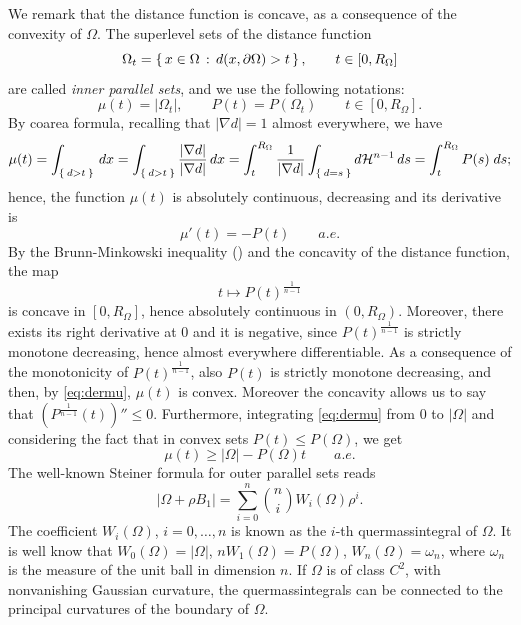 \documentclass[oneside,a4paper,11pt,notitlepage]{article}
\newcommand{\abs}[1]{{\left|#1\right|}}
\theoremstyle{definition}
\theoremstyle{plain}
\theoremstyle{definition}
\begin{document}
We remark that the distance function is concave, as a consequence of the convexity of $\Omega$.
The superlevel sets of the distance function
\begin{equation*}
    \Omega_t=\set{x\in \Omega \, : \, d(x,\partial\Omega)>t}, \qquad t\in[0, R_\Omega]
\end{equation*}
 are called \emph{inner parallel sets}, and we use the following notations:
 \begin{equation*}
 \mu(t)= \abs{\Omega_t}, \qquad P(t)=P(\Omega_t)\qquad t\in[0, R_\Omega].
 \end{equation*}
 By coarea formula, recalling that $\abs{\nabla d}=1$ almost everywhere, we have 
 $$\mu(t)=\int_{\Set{d>t}} \,  dx = \int_{\Set{d>t}} \frac{\abs{\nabla d}}{\abs{\nabla d}} \,  dx= \int_{t}^{R_\Omega} \frac{1}{\abs{\nabla d}} \int_{\Set{d=s}} d\mathcal{H}^{n-1} \, ds= \int_{t}^{R_\Omega} P(s)\; ds;$$
hence, the function $\mu(t)$ is absolutely continuous, decreasing and its derivative is  
\begin{equation}\label{eq:dermu}
    \mu'(t)=-P(t)\qquad a.e.
\end{equation}
By the Brunn-Minkowski inequality (\cite[Theorem 7.4.5]{schneider}) and the concavity of the distance function, the map
\begin{equation*}
    t \mapsto P(t)^{\frac{1}{n-1}}
\end{equation*}
is concave in $[0,R_{\Omega}]$, hence absolutely continuous in $(0,R_{\Omega})$. Moreover, there exists its right derivative at $0$ and it is negative, since $P(t)^{\frac{1}{n-1}}$ is strictly monotone decreasing, hence almost everywhere differentiable. As a consequence of the monotonicity of $P(t)^{\frac{1}{n-1}}$, also $P(t)$ is strictly monotone decreasing, and then, by \eqref{eq:dermu}, $\mu(t)$ is convex. Moreover the concavity allows us to say that $(P^\frac{1}{n-1}(t))''\le 0$. Furthermore, integrating \eqref{eq:dermu} from $0$ to $\abs{\Omega}$ and considering the fact that in convex sets $P(t)\le P(\Omega)$, we get
\begin{equation}
\label{steiner-measure}
    \mu(t) \ge \abs{\Omega}-P(\Omega)t \qquad a.e.
\end{equation}
The well-known Steiner formula for outer parallel sets reads
\[
|\Omega+\rho B_1| =\sum_{i=0}^{n} \binom{n}{i} W_i(\Omega) \rho^i.
\]
The coefficient $W_i(\Omega)$, $i=0,\ldots,n$ is known as the $i$-th
quermassintegral of $\Omega$. It is well know that $W_0(\Omega)=|\Omega|$,
$nW_1(\Omega)=P(\Omega)$, $W_n(\Omega)=\omega_n$, where $\omega_n$ is the measure of the unit ball in dimension $n$. If $\Omega$ is of class $C^2$, with
nonvanishing Gaussian curvature, the quermassintegrals can be connected
to the principal curvatures of the boundary of $\Omega$.
\end{document}
